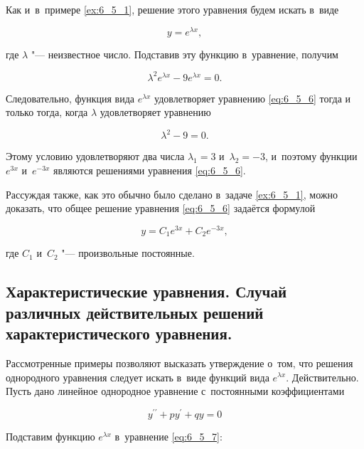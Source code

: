 Как и~в~примере \ref{ex:6_5_1}, решение этого уравнения будем искать в~виде

\begin{equation*}
y = e^{\lambda x},
\end{equation*} 

\noindent
где $\lambda$ "--- неизвестное число. Подставив эту функцию в~уравнение, получим

\begin{equation*}
\lambda^{2} e^{\lambda x} - 9 e^{\lambda x} = 0.
\end{equation*}

Следовательно, функция вида $e^{\lambda x}$ удовлетворяет уравнению \eqref{eq:6_5_6}
тогда и только тогда, когда $\lambda$ удовлетворяет уравнению

\begin{equation*}
\lambda^{2} - 9 = 0.
\end{equation*}

\noindent
Этому условию удовлетворяют два числа $\lambda_{1} = 3$ и~$\lambda_{2} = -3$,
и~поэтому функции $e^{3x}$ и~$e^{-3x}$ являются решениями уравнения \eqref{eq:6_5_6}.

Рассуждая также, как это обычно было сделано в~задаче \ref{ex:6_5_1}, можно доказать,
что общее решение уравнения \eqref{eq:6_5_6} задаётся формулой

\begin{equation*}
y = C_{1} e^{3x} + C_{2} e^{-3x},
\end{equation*}

\noindent
где $C_{1}$ и~$C_{2}$ "--- произвольные постоянные.


\subsection{Характеристические уравнения. Случай различных действительных
решений характеристического уравнения.}

Рассмотренные примеры позволяют высказать утверждение о~том, что решения однородного
уравнения следует искать в~виде функций вида $e^{\lambda x}$. Действительно.
Пусть дано линейное однородное уравнение с~постоянными коэффициентами

\begin{equation}\label{eq:6_5_7}
y^{\prime\prime} + py^\prime + qy = 0
\end{equation}

\noindent
Подставим функцию $e^{\lambda x}$ в~уравнение \eqref{eq:6_5_7}:

